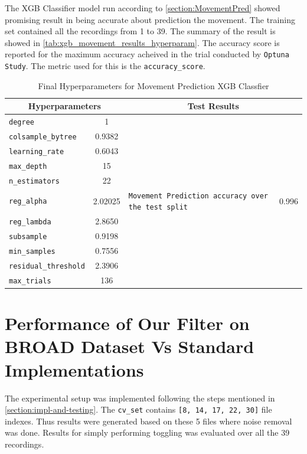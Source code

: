 \documentclass{iutbscthesis}
\begin{document}
The XGB Classifier model run according to \autoref{section:MovementPred} showed promising result in being accurate about prediction the movement. The training set contained all the recordings from 1 to 39. The summary of the result is showed in \autoref{tab:xgb_movement_results_hyperparam}. The accuracy score is reported for the maximum accuracy acheived in the trial conducted by \texttt{Optuna Study}. The metric used for this is the \texttt{accuracy\_score}\cite{labatut2012accuracy}.
\begin{table}[htbp]
\centering
\caption{Final Hyperparameters for Movement Prediction XGB Classfier}
\label{tab:xgb_movement_results_hyperparam}
\begin{tabular}{|l|c||p{}|c|}
    \hline
        \multicolumn{2}{|c||}{\textbf{Hyperparameters}} & \multicolumn{2}{c|}{\textbf{Test Results}} \\
        \hline
        \texttt{degree} & 1 &  &  \\
        \texttt{colsample\_bytree} & 0.9382 &  & \\
        \texttt{learning\_rate} & 0.6043 & & \\
        \texttt{max\_depth} & 15 & & \\
        \texttt{n\_estimators} & 22 & & \\
        \texttt{reg\_alpha} & 2.02025 & \texttt{Movement Prediction accuracy over the test split} & 0.996 \\
        \texttt{reg\_lambda} & 2.8650 & & \\
        \texttt{subsample} & 0.9198 & & \\
        \texttt{min\_samples} & 0.7556 & & \\
        \texttt{residual\_threshold} & 2.3906 & & \\
        \texttt{max\_trials} & 136 & & \\
        \hline
    \end{tabular}
\end{table}


\section{Performance of Our Filter on BROAD Dataset Vs Standard Implementations}

The experimental setup was implemented following the steps mentioned in \autoref{section:impl-and-testing}. The \texttt{cv\_set} contains \texttt{[8, 14, 17, 22, 30]} file indexes. Thus results were generated based on these 5 files where noise removal was done. Results for simply performing toggling was evaluated over all the 39 recordings.
\end{document}
